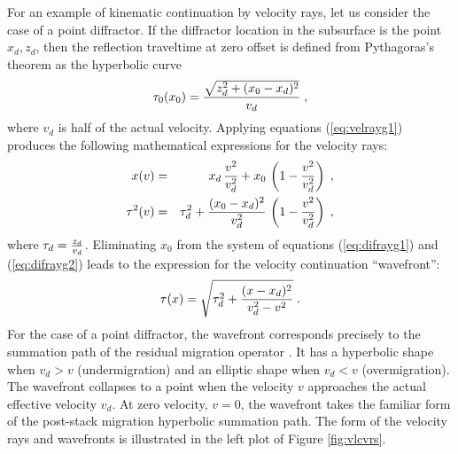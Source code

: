 For an example of kinematic continuation by velocity rays, let us
consider the case of a point diffractor. If the diffractor location in
the subsurface is the point ${x_d,z_d}$, then the reflection traveltime at
zero offset is defined from Pythagoras's theorem as the hyperbolic
curve
\begin{equation}
\tau_0(x_0) = {{\sqrt{z_d^2 + (x_0 - x_d)^2}} \over v_d}\;,
\label{eq:dift0}
\end{equation}
where $v_d$ is half of the actual velocity. Applying equations
(\ref{eq:velrayg1}) produces the following mathematical expressions
for the velocity rays:
\begin{eqnarray}
x(v) & = & x_d\,{v^2 \over v_d^2} + 
x_0\,\left(1 -  {v^2 \over v_d^2}\right)\;,
\label{eq:difrayg1} \\ 
\tau^2(v) & = & \tau_d^2 + {{(x_0 - x_d)^2} \over v_d^2}\,
\left(1 -  {v^2 \over v_d^2}\right)\;,
\label{eq:difrayg2} 
\end{eqnarray}
where $\tau_d = {z_d \over v_d}$.
Eliminating $x_0$ from the system of equations (\ref{eq:difrayg1}) and
(\ref{eq:difrayg2}) leads to the expression for the velocity continuation
``wavefront'': 
\begin{equation}
\tau(x)=\sqrt{\tau_d^2 + {{(x - x_d)^2} \over {v_d^2 - v^2}}}\;.
\label{eq:diffront}
\end{equation}
For the case of a point diffractor, the wavefront corresponds precisely
to the summation path of the residual migration operator
\cite[]{GEO50-01-01100126}. It has a hyperbolic shape when $v_d > v$
(undermigration) and an elliptic shape when $v_d < v$
(overmigration). The wavefront collapses to a point when the velocity
$v$ approaches the actual effective velocity $v_d$. At zero
velocity, $v=0$, the wavefront takes the familiar form of the post-stack migration
hyperbolic summation path. The form of the velocity rays and wavefronts
is illustrated in the left plot of Figure \ref{fig:vlcvrs}.



